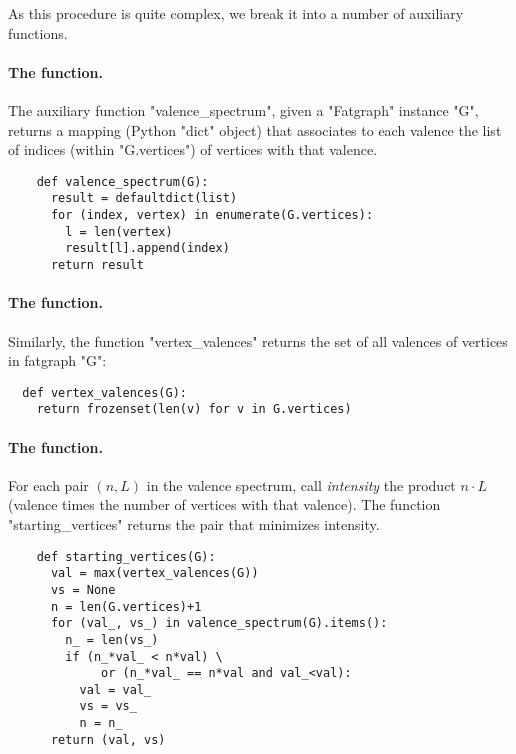 As this procedure is quite complex, we break it into a
number of auxiliary functions.

\paragraph{The  function.}
The auxiliary function "valence_spectrum", given a "Fatgraph" instance
"G", returns a mapping (Python "dict" object) that associates to each
valence the list of indices (within "G.vertices") of vertices with
that valence.
\begin{lstlisting}
    def valence_spectrum(G):
      result = defaultdict(list)
      for (index, vertex) in enumerate(G.vertices):
        l = len(vertex)
        result[l].append(index)
      return result

\end{lstlisting}

\paragraph{The  function.}
Similarly, the function "vertex_valences" returns the set of all
valences of vertices in fatgraph "G":
\begin{lstlisting}
  def vertex_valences(G):
    return frozenset(len(v) for v in G.vertices)
\end{lstlisting}

\paragraph{The  function.}
For each pair $(n, L)$ in the valence spectrum, call \emph{intensity}
the product $n \cdot L$ (valence times the number of vertices with
that valence).  The function "starting_vertices" returns the pair that
minimizes intensity.
\begin{lstlisting}
    def starting_vertices(G):
      val = max(vertex_valences(G))
      vs = None
      n = len(G.vertices)+1
      for (val_, vs_) in valence_spectrum(G).items():
        n_ = len(vs_)
        if (n_*val_ < n*val) \
             or (n_*val_ == n*val and val_<val):
          val = val_
          vs = vs_
          n = n_
      return (val, vs)

\end{lstlisting}

